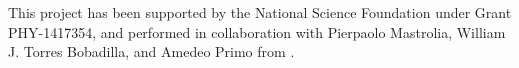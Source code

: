\documentclass[10pt]{article}
\begin{document}
This project has been supported by the National Science Foundation under Grant PHY-1417354, and performed in collaboration with Pierpaolo Mastrolia, William J. Torres Bobadilla, and Amedeo Primo from \color{magenta}{Universita’ degli Studi di Padova}.
\end{document}
